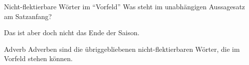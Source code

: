 \begin{frame}
  {Nicht-flektierbare Wörter im "`Vorfeld"'}
  \pause
  Was steht im unabhängigen Aussagesatz am Satzanfang?\\
  \pause
  {}
  \pause
  \begin{exe}
    \ex\label{ex:adverbenadkopulasundpartikeln038}
    \begin{xlist}
      \pause
      \pause
      \pause
      \pause
      \pause
      \pause
      \pause
      \pause
      \pause
      \pause
    \end{xlist}
    \ex\label{ex:adverbenadkopulasundpartikeln044} Das ist aber \alert{doch} nicht das Ende der Saison.
  \end{exe}
  \pause
  \Viertelzeile
  \begin{block}{Adverb}
    Adverben sind die übriggebliebenen nicht-flektierbaren Wörter, die im Vorfeld stehen können.
  \end{block}
\end{frame}


